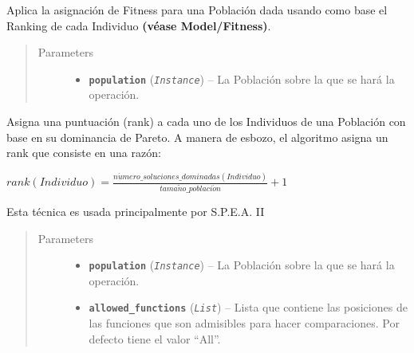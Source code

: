 \documentclass[class=report, crop=false]{standalone}
\begin{document}
\begin{fulllineitems}
\begin{fulllineitems}

Aplica la asignación de Fitness para una Población dada 
usando como base el Ranking de cada Individuo \textbf{(véase Model/Fitness)}.

\begin{quote}\begin{description}
\item[{Parameters}] \leavevmode\begin{itemize}
\item \textbf{\texttt{population}} (\emph{\texttt{Instance}}) -- La Población sobre la que se hará la operación.
\end{itemize}
\end{description}\end{quote}

\end{fulllineitems}

\begin{fulllineitems}

Asigna una puntuación (rank) a cada uno de los Individuos 
de una Población con base en su dominancia de Pareto.\break
A manera de esbozo, el algoritmo asigna un rank que consiste 
en una razón:

\begin{center}\(rank(Individuo) = \frac{n\acute{u}mero\_soluciones\_dominadas(Individuo)}{tama\tilde{n}o\_poblaci\acute{o}n} + 1\)
\end{center}

Esta técnica es usada principalmente por S.P.E.A. II

\begin{quote}\begin{description}
\item[{Parameters}] \leavevmode\begin{itemize}
\item \textbf{\texttt{population}} (\emph{\texttt{Instance}}) -- La Población sobre la que se hará la operación.
\item \textbf{\texttt{allowed\_functions}} (\emph{\texttt{List}}) -- Lista que contiene las posiciones de las funciones que son admisibles 
para hacer comparaciones. Por defecto tiene el valor ``All''.
\end{itemize}
\end{description}\end{quote}


\end{fulllineitems}
\end{fulllineitems}
\end{document}

